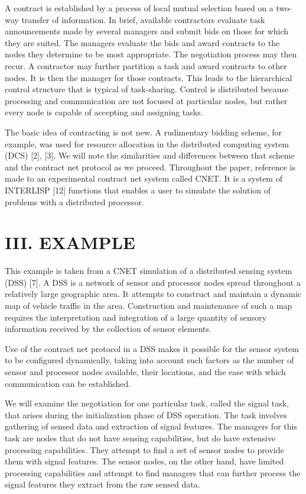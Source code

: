 \documentclass[
]{article}
\begin{document}
A contract is established by a process of local mutual selection based
on a two-way transfer of information. In brief, available contractors
evaluate task announcements made by several managers and submit bids on
those for which they are suited. The managers evaluate the bids and
award contracts to the nodes they determine to be most appropriate. The
negotiation process may then recur. A contractor may further partition a
task and award contracts to other nodes. It is then the manager for
those contracts. This leads to the hierarchical control structure that
is typical of task-sharing. Control is distributed because processing
and communication are not focused at particular nodes, but rather every
node is capable of accepting and assigning tasks.

The basic idea of contracting is not new. A rudimentary bidding scheme,
for example, was used for resource allocation in the distributed
computing system (DCS) {[}2{]}, {[}3{]}. We will note the similarities
and differences between that scheme and the contract net protocol as we
proceed. Throughout the paper, reference is made to an experimental
contract net system called CNET. It is a system of INTERLISP {[}12{]}
functions that enables a user to simulate the solution of problems with
a distributed processor.

\section{III. EXAMPLE}\label{iii.-example}

This example is taken from a CNET simulation of a distributed sensing
system (DSS) {[}7{]}. A DSS is a network of sensor and processor nodes
spread throughout a relatively large geographic area. It attempts to
construct and maintain a dynamic map of vehicle traffic in the area.
Construction and maintenance of such a map requires the interpretation
and integration of a large quantity of sensory information received by
the collection of sensor elements.

Use of the contract net protocol in a DSS makes it possible for the
sensor system to be configured dynamically, taking into account such
factors as the number of sensor and processor nodes available, their
locations, and the ease with which communication can be established.

We will examine the negotiation for one particular task, called the
signal task, that arises during the initialization phase of DSS
operation. The task involves gathering of sensed data and extraction of
signal features. The managers for this task are nodes that do not have
sensing capabilities, but do have extensive processing capabilities.
They attempt to find a set of sensor nodes to provide them with signal
features. The sensor nodes, on the other hand, have limited processing
capabilities and attempt to find managers that can further process the
signal features they extract from the raw sensed data.
\end{document}
